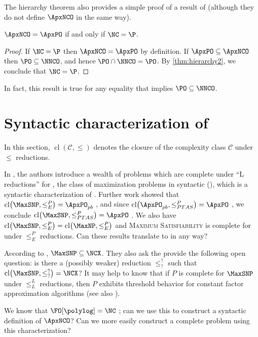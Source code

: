 \documentclass[]{article}
\newcommand{\cl}{\operatorname{cl}}
\let\originalleft\left
\let\originalright\right
\renewcommand{\left}{\mathopen{}\mathclose\bgroup\originalleft}
\renewcommand{\right}{\aftergroup\egroup\originalright}
\begin{document}
The hierarchy theorem also provides a simple proof of a result of \cite{dsst97} (although they do not define $\ApxNCO$ in the same way).

\begin{corollary}
  $\ApxNCO = \ApxPO$ if and only if $\NC = \P$.
\end{corollary}
\begin{proof}
  If $\NC = \P$ then $\ApxNCO = \ApxPO$ by definition.
  If $\ApxPO \subseteq \ApxNCO$ then $\PO \subseteq \NNCO$, and hence $\PO \cap \NNCO = \PO$.
  By \autoref{thm:hierarchy2}, we conclude that $\NC = \P$.
\end{proof}

In fact, this result is true for any equality that implies $\PO \subseteq \NNCO$.

\section{Syntactic characterization of \texorpdfstring{\ApxNCO}{ApxNCO}}

In this section, $\cl(\mathcal{C}, \leq)$ denotes the closure of the complexity class $\mathcal{C}$ under $\leq$ reductions.

In \cite{py91}, the authors introduce a wealth of problems which are complete under ``L reductions'' for \MaxSNP, the class of maximization problems in syntactic \NP{} (\SNP), which is a syntactic characterization of \NP.
Further work showed that $\cl\left(\MaxSNP, \leq^P_E\right) = \ApxPO_{pb}$ \cite[Theorem~1]{kmsv99}, and since $\cl\left(\ApxPO_{pb}, \leq^P_{PTAS}\right) = \ApxPO$ \cite{ct00}, we conclude $\cl\left(\MaxSNP, \leq^P_{PTAS}\right) = \ApxPO$ \cite{kmsv99}.
We also have $\cl\left(\MaxSNP, \leq^P_E\right) = \cl\left(\MaxNP, \leq^P_E\right)$ \cite[Theorem~2]{kmsv99} and \textsc{Maximum Satisfiability} is complete for \MaxNP{} under $\leq^P_E$ reductions.
Can these results translate to \NC{} in any way?

According to \cite[Theorem~9.1.3]{dsst97}, $\MaxSNP \subseteq \NCX$.
They also ask the provide the following open question: is there a (possibly weaker) reduction $\leq^?_?$ such that $\cl\left(\MaxSNP, \leq^?_?\right) = \NCX$?
It may help to know that if $P$ is complete for $\MaxSNP$ under $\leq^L_L$ reductions, then $P$ exhibits threshold behavior for constant factor \NC{} approximation algorithms \cite[Theorem~9]{sx95} (see also \cite[Theorem~9.2.3]{dsst97}).

\begin{todo}
  We know that $\FO[\polylog] = \NC$ \cite[Theorem~5.2]{immerman99}; can we use this to construct a syntactic definition of $\ApxNCO$?
  Can we more easily construct a complete problem using this characterization?
\end{todo}
\end{document}
